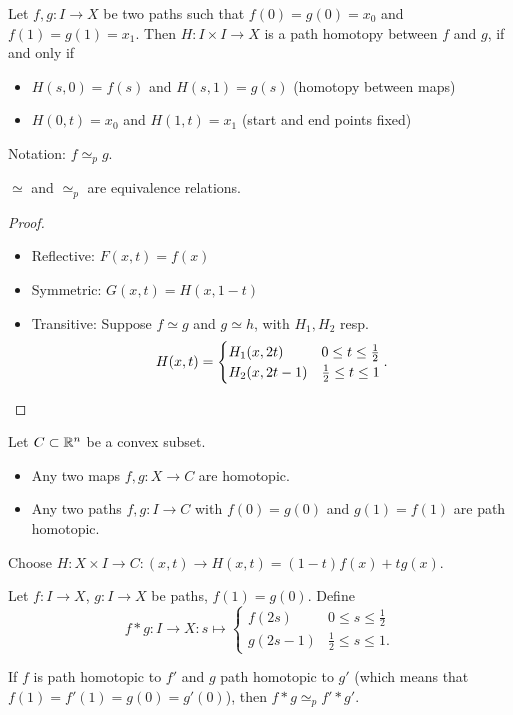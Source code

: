 \begin{definition}
    Let $f, g: I \to  X$ be two paths such that $f(0) = g(0) = x_0$ and $f(1) = g(1) = x_1$. Then $H: I \times  I \to  X$ is a path homotopy between $f$ and $g$, if and only if
    \begin{itemize}
        \item $H(s,0) = f(s)$ and  $H(s, 1) = g(s)$ (homotopy between maps)
        \item  $H(0, t) = x_0$ and $H(1, t) = x_1$ (start and end points fixed)
    \end{itemize}
    Notation: $f \simeq_p g$.
\end{definition}


\begin{lemma}
    $\simeq$ and  $\simeq_p$ are equivalence relations.
\end{lemma}
\begin{proof}
    \leavevmode
    \begin{itemize}
        \item Reflective: $F(x, t) = f(x)$
        \item Symmetric: $G(x, t) = H(x, 1-t)$ 
        \item Transitive:  Suppose $f \simeq g$ and  $g \simeq h$, with  $H_1, H_2$ resp.
            \[
                H(x, t) = \begin{cases}
                    H_1(x, 2t) & 0 \le t \le  \frac{1}{2}\\
                    H_2(x, 2t-1) & \frac{1}{2} \le  t \le  1
                \end{cases}
            . \qedhere
        \] 
    \end{itemize}
\end{proof}


\begin{eg}
   Let $C \subset \mathbb{R}^n$ be a convex subset.
   \begin{itemize}
       \item Any two maps $f, g: X \to C$ are homotopic.
       \item Any two paths $f, g: I \to  C$ with $f(0) = g(0)$ and  $g(1) = f(1)$ are path homotopic.
   \end{itemize}

   Choose $H: X \times I \to  C: (x, t) \to  H(x, t) = (1-t) f(x) + t g(x)$.
\end{eg}


Let $f: I\to X$, $g: I \to X$ be paths, $f(1) = g(0)$.
Define  \[
    f*g: I \to X: s \mapsto \begin{cases}
        f(2s) & 0 \le  s \le  \frac{1}{2}\\
        g(2s - 1) & \frac{1}{2}\le s\le 1.
\end{cases}
\]
\begin{remark}
    If $f$ is path homotopic to $f'$ and $g$ path homotopic to $g'$ (which means that $f(1) = f'(1) = g(0) = g'(0)$), then $f * g \simeq_p f' * g'$.
\end{remark}

